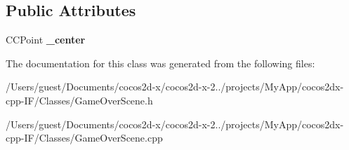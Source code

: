 \subsection*{Public Attributes}
\begin{DoxyCompactItemize}
\item 
\hypertarget{class_game_over_layer_aa0c123c678b8fafad5984df878d74aee}{C\-C\-Point {\bfseries \-\_\-center}}\label{class_game_over_layer_aa0c123c678b8fafad5984df878d74aee}

\end{DoxyCompactItemize}


The documentation for this class was generated from the following files\-:\begin{DoxyCompactItemize}
\item 
/\-Users/guest/\-Documents/cocos2d-\/x/cocos2d-\/x-\/2../projects/\-My\-App/cocos2dx-\/cpp-\/\-I\-F/\-Classes/Game\-Over\-Scene.\-h\item 
/\-Users/guest/\-Documents/cocos2d-\/x/cocos2d-\/x-\/2../projects/\-My\-App/cocos2dx-\/cpp-\/\-I\-F/\-Classes/Game\-Over\-Scene.\-cpp\end{DoxyCompactItemize}
